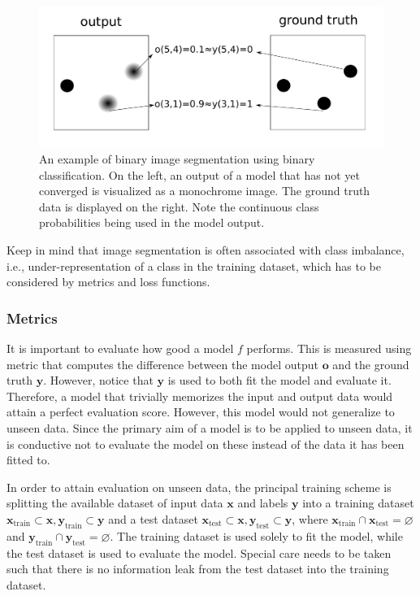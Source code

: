 \begin{figure}
    \centering
    \includegraphics[width=\textwidth]{graphics/binaryseg.pdf}
    \caption{An example of binary image segmentation using binary classification. On the left, an output of a model that has not yet converged is visualized as a monochrome image. The ground truth data is displayed on the right. Note the continuous class probabilities being used in the model output.}
    \label{fig:binaryseg}
\end{figure}

Keep in mind that image segmentation is often associated with class imbalance, i.e., under-representation of a class in the training dataset, which has to be considered by metrics and loss functions.



\subsubsection{Metrics}
\label{subsubsec:metrics}
It is important to evaluate how good a model $f$ performs. This is measured using metric that computes the difference between the model output $\mathbf{o}$ and the ground truth $\mathbf{y}$. However, notice that $\mathbf{y}$ is used to both fit the model and evaluate it. Therefore, a model that trivially memorizes the input and output data would attain a perfect evaluation score. However, this model would not generalize to unseen data. Since the primary aim of a model is to be applied to unseen data, it is conductive not to evaluate the model on these instead of the data it has been fitted to.

In order to attain evaluation on unseen data, the principal training scheme is splitting the available dataset of input data $\mathbf{x}$ and labels $\mathbf{y}$ into a training dataset $\mathbf{x}_\text{train} \subset \mathbf{x}, \mathbf{y}_\text{train} \subset \mathbf{y}$ and a test dataset $\mathbf{x}_\text{test} \subset \mathbf{x}, \mathbf{y}_\text{test} \subset \mathbf{y}$, where $\mathbf{x}_\text{train} \cap \mathbf{x}_\text{test} = \varnothing$ and $\mathbf{y}_\text{train} \cap \mathbf{y}_\text{test} = \varnothing$. The training dataset is used solely to fit the model, while the test dataset is used to evaluate the model. Special care needs to be taken such that there is no information leak from the test dataset into the training dataset.

